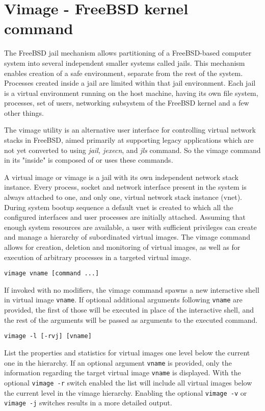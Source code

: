 \section{Vimage - FreeBSD kernel command}
The FreeBSD jail mechanism allows partitioning of a FreeBSD-based computer
system into several independent smaller systems called jails. This mechanism
enables creation of a safe environment, separate from the rest of the system.
Processes created inside a jail are limited within that jail environment. Each
jail is a virtual environment running on the host machine, having its own file
system, processes, set of users, networking subsystem of the FreeBSD kernel and
a few other things.     

The vimage utility is an alternative user interface for controlling virtual
network stacks in FreeBSD, aimed primarily at supporting legacy applications
which are not yet converted to using \emph{jail, jexecn}, and \emph{jls}
command. So the vimage command in its "inside" is composed of or uses these
commands. 

A virtual image or vimage is a jail with its own independent network stack
instance.  Every process, socket and network interface present in the system is
always attached to one, and only one, virtual network stack instance (vnet).
During system bootup sequence a default vnet is created to which all the
configured interfaces and user processes are initially attached.  Assuming that
enough system resources are available, a user with sufficient privileges can
create and manage a hierarchy of subordinated virtual images.  The vimage
command allows for creation, deletion and monitoring of virtual images, as well
as for execution of arbitrary processes in a targeted virtual image.

\texttt{vimage vname [command ...]} \hfill

If invoked with no modifiers, the vimage command spawns a new interactive shell
in virtual image \texttt{vname}.  If optional additional arguments following
\texttt{vname} are provided, the first of those will be executed in place of
the interactive shell, and the rest of the arguments will be passed as
arguments to the executed command.

\texttt{vimage -l [-rvj] [vname]} \hfill
 
List the properties and statistics for virtual images one level below the
current one in the hierarchy. If an optional argument \texttt{vname} is
provided, only the information regarding the target virtual image
\texttt{vname} is displayed.  With the optional \texttt{vimage -r} switch
enabled the list will include all virtual images below the current level in the
vimage hierarchy.  Enabling the optional \texttt{vimage -v} or \texttt{vimage
-j} switches results in a more detailed output.

